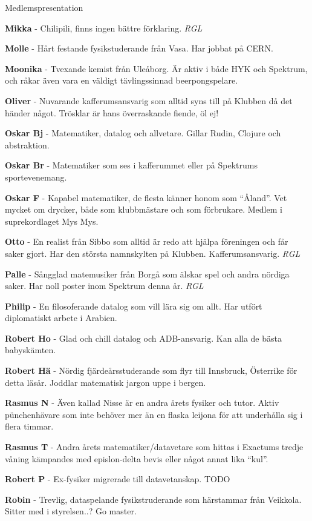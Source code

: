 \documentclass{spektraklet}
\begin{document}
\begin{artikel}{Medlemspresentation}{}
\begin{twocolumns}
\textbf{Mikka} - Chilipili, finns ingen bättre förklaring. \emph{RGL} %

\textbf{Molle} -  Hårt festande fysikstuderande från Vasa. Har jobbat på CERN. %

\textbf{Moonika} - Tvexande kemist från Uleåborg. Är aktiv i både HYK och Spektrum, och råkar även vara en väldigt tävlingssinnad beerpongspelare.

\textbf{Oliver} - Nuvarande kafferumsansvarig som alltid syns till på Klubben då det händer något. Trösklar är hans överraskande fiende, öl ej!

\textbf{Oskar Bj} - Matematiker, datalog och allvetare. Gillar Rudin, Clojure och abstraktion.

\textbf{Oskar Br} - Matematiker som ses i kafferummet eller på Spektrums sportevenemang.

\textbf{Oskar F} -  Kapabel matematiker, de flesta känner honom som ``Åland''. Vet mycket om drycker, både som klubbmästare och som förbrukare. Medlem i suprekordlaget Mys Mys.

\textbf{Otto} - En realist från Sibbo som alltid är redo att hjälpa föreningen och får saker gjort. Har den största namnskylten på Klubben. Kafferumsansvarig. \emph{RGL}

\textbf{Palle} - Sångglad matemusiker från Borgå som älskar spel och andra nördiga saker. Har noll poster inom Spektrum denna år. \emph{RGL} %

\textbf{Philip} - En filosoferande datalog som vill lära sig om allt. Har utfört diplomatiskt arbete i Arabien.

\textbf{Robert Ho} - Glad och chill datalog och ADB-ansvarig. Kan alla de bästa babyskämten.

\textbf{Robert Hä} - Nördig fjärdeårsstuderande som flyr till Innsbruck, Österrike för detta läsår. Joddlar matematisk jargon uppe i bergen.

\textbf{Rasmus N} - Även kallad Nisse är en andra årets fysiker och tutor. Aktiv pünchenhävare som inte behöver mer än en flaska leijona för att underhålla sig i flera timmar.

\textbf{Rasmus T} - Andra årets matematiker/datavetare som hittas i Exactums tredje våning kämpandes med epislon-delta bevis eller något annat lika ``kul''.

\textbf{Robert P} - Ex-fysiker migrerade till datavetanskap. TODO

\textbf{Robin} - Trevlig, dataspelande fysikstruderande som härstammar från Veikkola. Sitter med i styrelsen..? Go master.


\end{twocolumns}
\end{artikel}
\end{document}
